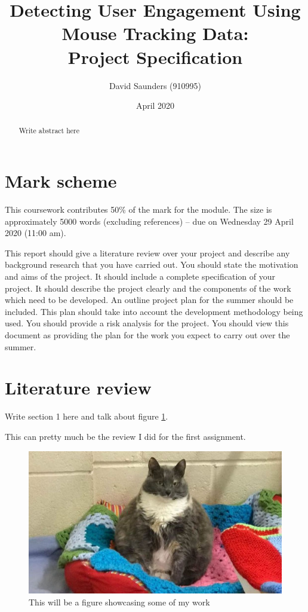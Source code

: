 \documentclass{article}
\title{Detecting User Engagement Using \\ Mouse Tracking Data:\\
    \large Project Specification
}
\author{David Saunders (910995)}
\date{April 2020}
\begin{document}
\maketitle

\begin{abstract} 
    Write abstract here
\end{abstract}

\tableofcontents

\section*{Mark scheme}
This coursework contributes 50\% of the mark for the module. The size is
approximately 5000 words (excluding references) – due on Wednesday 29
April 2020 (11:00 am).

This report should give a literature review over your project and describe
any background research that you have carried out. You should state the motivation and aims of the project. It should include a complete specification
of your project. It should describe the project clearly and the components
of the work which need to be developed. An outline project plan for the
summer should be included. This plan should take into account the development methodology being used. You should provide a risk analysis for the
project. You should view this document as providing the plan for the work
you expect to carry out over the summer.

\section{Literature review}

Write section 1 here \cite{torsney2011tuner} and talk about figure \ref{fig:test}.

This can pretty much be the review I did for the first assignment. 

\begin{figure}[ht]
    \centering
    \includegraphics[scale=0.35]{Test.JPG}
    \caption{This will be a figure showcasing some of my work}
    \label{fig:test}
\end{figure}
\end{document}
